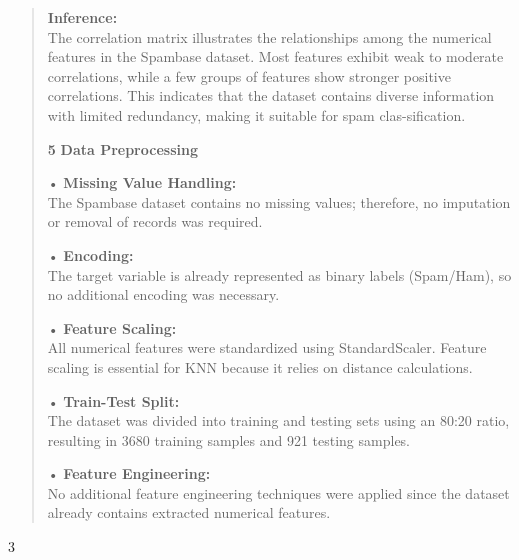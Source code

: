 \documentclass[
]{article}
\begin{document}
\begin{quote}
\textbf{Inference:}\\
The correlation matrix illustrates the relationships among the numerical
features in the Spambase dataset. Most features exhibit weak to moderate
correlations, while a few groups of features show stronger positive
correlations. This indicates that the dataset contains diverse
information with limited redundancy, making it suitable for spam
clas-sification.

\textbf{5} \textbf{Data Preprocessing}

• \textbf{Missing Value Handling:}\\
The Spambase dataset contains no missing values; therefore, no
imputation or removal of records was required.

• \textbf{Encoding:}\\
The target variable is already represented as binary labels (Spam/Ham),
so no additional encoding was necessary.

• \textbf{Feature Scaling:}\\
All numerical features were standardized using StandardScaler. Feature
scaling is essential for KNN because it relies on distance calculations.

• \textbf{Train-Test Split:}\\
The dataset was divided into training and testing sets using an 80:20
ratio, resulting in 3680 training samples and 921 testing samples.

• \textbf{Feature Engineering:}\\
No additional feature engineering techniques were applied since the
dataset already contains extracted numerical features.
\end{quote}

3
\end{document}
